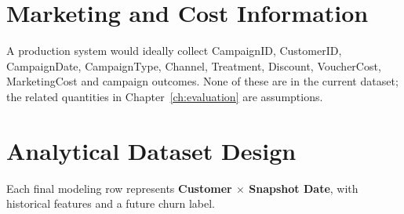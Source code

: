 \section{Marketing and Cost Information}
\label{sec:4-7}

A production system would ideally collect CampaignID, CustomerID, CampaignDate, CampaignType, Channel, Treatment, Discount, VoucherCost, MarketingCost and campaign outcomes. None of these are in the current dataset; the related quantities in Chapter~\ref{ch:evaluation} are assumptions.

\section{Analytical Dataset Design}
\label{sec:4-8}

Each final modeling row represents \textbf{Customer $\times$ Snapshot Date}, with historical features and a future churn label.
